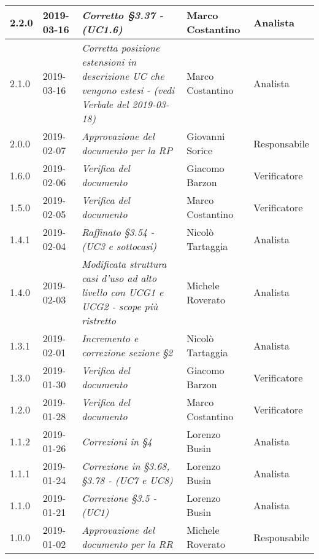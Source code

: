 \begin{longtable}{C{2cm}|C{2.5cm}|C{4.5cm}|C{2.5cm}|C{3cm}}
		2.2.0 & 2019-03-16 & \emph{Corretto §3.37 - (UC1.6)} & Marco Costantino & Analista \\
		\hline
	
	    2.1.0 & 2019-03-16 & \emph{Corretta posizione estensioni in descrizione UC che vengono estesi  - (vedi Verbale del 2019-03-18)} & Marco Costantino & Analista \\
	    \hline
	
		2.0.0 & 2019-02-07 & \emph{Approvazione del documento per la RP} & Giovanni Sorice & Responsabile \\
		\hline
	
		1.6.0 & 2019-02-06 & \emph{Verifica del documento} & Giacomo Barzon & Verificatore \\
		\hline
		
		1.5.0 & 2019-02-05 & \emph{Verifica del documento} & Marco Costantino & Verificatore \\
		\hline
	
		1.4.1 & 2019-02-04 & \emph{Raffinato §3.54 -  (UC3 e sottocasi)} & Nicolò Tartaggia & Analista \\
		\hline
	
		1.4.0 & 2019-02-03 & \emph{Modificata struttura casi d'uso ad alto livello con UCG1 e UCG2 - scope più ristretto} & Michele Roverato & Analista \\
		\hline
	
		1.3.1 & 2019-02-01 & \emph{Incremento e correzione sezione §2} & Nicolò Tartaggia & Analista \\
		\hline
	
		1.3.0 & 2019-01-30 & \emph{Verifica del documento} & Giacomo Barzon & Verificatore \\
		\hline
		
		1.2.0 & 2019-01-28 & \emph{Verifica del documento} & Marco Costantino & Verificatore \\
		\hline
	
		1.1.2 & 2019-01-26 & \emph{Correzioni in §4} & Lorenzo Busin & Analista \\
		\hline
	
		1.1.1 & 2019-01-24 & \emph{Correzione in §3.68, §3.78 - (UC7 e UC8)} & Lorenzo Busin & Analista \\
		\hline	
	
		1.1.0 & 2019-01-21 & \emph{Correzione §3.5 - (UC1)} & Lorenzo Busin & Analista \\
		\hline
		
		1.0.0 & 2019-01-02 & \emph{Approvazione del documento per la RR} & Michele Roverato & Responsabile \\
		\hline
		

\end{longtable}
